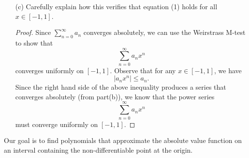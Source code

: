 \begin{enumerate}
\begin{proof}[Solution]
\begin{align*}
        &= \frac{ -1  }{ (2n-1)  }  \cdot \frac{ 1 \cdot 3 \cdot 5 \dotsb (2n-1)  }{ 2 \cdot 4 \cdot 6 \dotsb 2n  } \\     
        &= -\frac{ c_n }{ 2n-1 }.  
        \end{align*}
        Since \( c_n < \frac{ 2 }{ \sqrt{ 2n-1 }  }  \) for \( n \geq 1  \), we can write 
        \[  | a_n |  = \frac{ c_{n} }{ 2n-1 } < \frac{ 2 }{ (2n-1)\sqrt{ 2n+1 }  }    \]
        which creates a series 
        \[  \sum_{ n=1 }^{ \infty  } \frac{ 2 }{ (2n-1) \sqrt{ 2n+1 }  }     \]
        that converges via the root test. Hence, we have \( \sum_{ n=0 }^{ \infty  } a_n  \) converges absolutely.
        \end{proof}
    \item[(c)] Carefully explain how this verifies that equation (1) holds for all \( x \in [-1,1] \).
        \begin{proof}
        Since \( \sum_{ n=0 }^{ \infty  } a_n  \) converges absolutely, we can use the Weirstrass M-test to show that 
        \[  \sum_{ n=0 }^{ \infty  } a_n x^{n}  \] converges uniformly on \( [-1,1] \). Observe that for any \( x \in [-1,1]  \), we have 
        \[  | a_{n} x^{n} | \leq a_{n}.\] Since the right hand side of the above inequality produces a series that converges absolutely (from part(b)), we know that the power series \[  \sum_{ n=0 }^{ \infty  } a_{n} x^{n}  \] must converge uniformly on \( [-1,1] \). 
        \end{proof}
\end{enumerate}

Our goal is to find polynomials that approximate the absolute value function on an interval containing the non-differentiable point at the origin.

